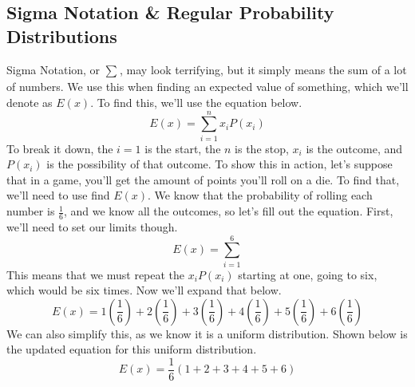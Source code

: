     \subsection{Sigma Notation \& Regular Probability Distributions}
    Sigma Notation, or $\sum_{}^{}$, may look terrifying, but it simply means the sum of a lot of numbers. We use this when finding an expected value of something, which we'll denote as $E(x)$. To find this, we'll use the equation below.
    \begin{equation*}
        E(x) = \sum_{i=1}^{n}x_{i}P(x_{i})
    \end{equation*}
    To break it down, the $i=1$ is the start, the $n$ is the stop, $x_{i}$ is the outcome, and $P(x_{i})$ is the possibility of that outcome.
    To show this in action, let's suppose that in a game, you'll get the amount of points you'll roll on a die.
    To find that, we'll need to use find $E(x)$.
    We know that the probability of rolling each number is $\frac{1}{6}$, and we know all the outcomes, so let's fill out the equation. First, we'll need to set our limits though.
    \begin{equation*}
        E(x) = \sum_{i=1}^{6}
    \end{equation*}
    This means that we must repeat the $x_{i}P(x_{i})$ starting at one, going to six, which would be six times.
    Now we'll expand that below.
    \begin{equation*}
        E(x) = 1(\frac{1}{6}) + 2(\frac{1}{6}) + 3(\frac{1}{6}) + 4(\frac{1}{6}) + 5(\frac{1}{6}) + 6(\frac{1}{6})
    \end{equation*}
    We can also simplify this, as we know it is a uniform distribution. Shown below is the updated equation for this uniform distribution.
    \begin{equation*}
        E(x) = \frac{1}{6}(1 + 2 + 3 + 4 + 5 + 6)
    \end{equation*}
    
